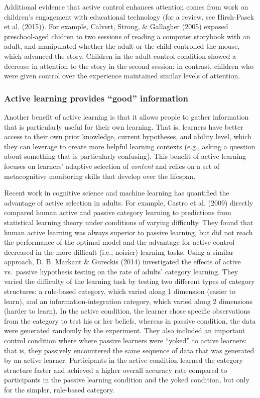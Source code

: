 \documentclass[a4paper,man,apacite,floatsintext]{apa6}
\begin{document}
Additional evidence that active control enhances attention comes from
work on children's engagement with educational technology (for a review,
see Hirsh-Pasek et al. (2015)). For example, Calvert, Strong, \&
Gallagher (2005) exposed preschool-aged chidren to two sessions of
reading a computer storybook with an adult, and manipulated whether the
adult or the child controlled the mouse, which advanced the story.
Children in the adult-control condition showed a decrease in attention
to the story in the second session; in contrast, children who were given
control over the experience maintained similar levels of attention.

\subsubsection{\texorpdfstring{Active learning provides ``good''
information}{Active learning provides good information}}\label{active-learning-provides-good-information}

Another benefit of active learning is that it allows people to gather
information that is particularly useful for their own learning. That is,
learners have better access to their own prior knowledge, current
hypotheses, and ability level, which they can leverage to create more
helpful learning contexts (e.g., asking a question about something that
is particularly confusing). This benefit of active learning focuses on
learners' adaptive selection of \emph{content} and relies on a set of
metacognitive monitoring skills that develop over the lifespan.

Recent work in cognitive science and machine learning has quantified the
advantage of active selection in adults. For example, Castro et al.
(2009) directly compared human active and passive category learning to
predictions from statistical learning theory under conditions of varying
difficulty. They found that human active learning was always superior to
passive learning, but did not reach the performance of the optimal model
and the advantage for active control decreased in the more difficult
(i.e., noisier) learning tasks. Using a similar approach, D. B. Markant
\& Gureckis (2014) investigated the effects of active vs.~passive
hypothesis testing on the rate of adults' category learning. They varied
the difficulty of the learning task by testing two different types of
category structures: a rule-based category, which varied along 1
dimension (easier to learn), and an information-integration category,
which varied along 2 dimensions (harder to learn). In the active
condition, the learner chose specific observations from the category to
test his or her beliefs, whereas in passive condition, the data were
generated randomly by the experiment. They also included an important
control condition where where passive learners were ``yoked'' to active
learners: that is, they passively encountered the same sequence of data
that was generated by an active learner. Participants in the active
condition learned the category structure faster and achieved a higher
overall accuracy rate compared to participants in the passive learning
condition and the yoked condition, but only for the simpler, rule-based
category.
\end{document}
